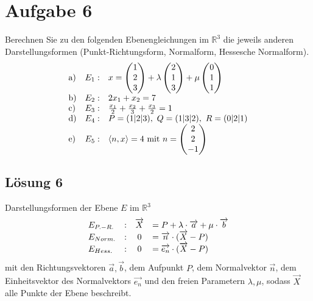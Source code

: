 \section{Aufgabe 6}

Berechnen Sie zu den folgenden Ebenengleichungen im $\displaystyle \mathbb{R}^{3}$ die jeweils anderen Darstellungsformen (Punkt-Richtungsform, Normalform, Hessesche Normalform).
\begin{equation*}
	\begin{array}{ l r l }
		\text{a)} & E_{1} : & x=\begin{pmatrix}
			1\\
			2\\
			3
		\end{pmatrix} +\lambda \begin{pmatrix}
			2\\
			1\\
			3
		\end{pmatrix} +\mu \begin{pmatrix}
			0\\
			1\\
			1
		\end{pmatrix}\\
		\text{b)} & E_{2} : & 2x_{1} +x_{2} =7\\
		\text{c)} & E_{3} : & \frac{x_{1}}{2} +\frac{x_{2}}{3} +\frac{x_{3}}{2} =1\\
		\text{d)} & E_{4} : & P=( 1|2|3) ,\ Q=( 1|3|2) ,\ R=( 0|2|1)\\
		\text{e)} & E_{5} : & \langle n,x\rangle =4\ \text{mit} \ n=\begin{pmatrix}
			2\\
			2\\
			-1
		\end{pmatrix}
	\end{array}
\end{equation*}

\subsection{Lösung 6}

Darstellungsformen der Ebene $\displaystyle E$ im $\displaystyle \mathbb{R}^{3}$
\begin{equation*}
	\begin{array}{ l l c l }
		E_{P.-R.} & : & \vec{X} & =P+\lambda \cdotp \vec{a} +\mu \cdotp \vec{b}\\
		E_{Norm.} & : & 0 & =\vec{n} \cdotp (\vec{X} -P)\\
		E_{Hess.} & : & 0 & =\overrightarrow{e_{n}} \cdotp (\vec{X} -P)
	\end{array}
\end{equation*}
mit den Richtungsvektoren $\displaystyle \vec{a} ,\vec{b}$, dem Aufpunkt $\displaystyle P$, dem Normalvektor $\displaystyle \vec{n}$, dem Einheitsvektor des Normalvektors $\displaystyle \overrightarrow{e_{n}}$ und den freien Parametern $\displaystyle \lambda ,\mu $, sodass $\displaystyle \vec{X}$ alle Punkte der Ebene beschreibt.



